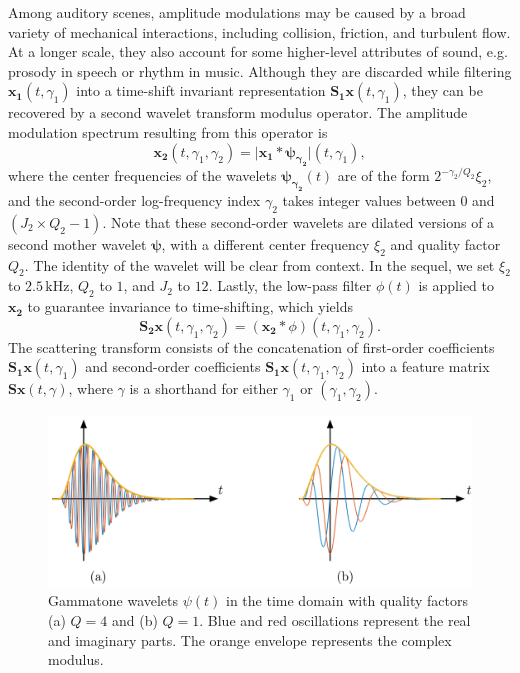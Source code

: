 \documentclass[journal]{IEEEtran}
\makeatletter
\newcommand*{\eg}{e.g.\@\xspace}
\makeatother
\begin{document}
Among auditory scenes, amplitude modulations may be caused by a broad variety of mechanical interactions, including collision, friction, and turbulent flow.
At a longer scale, they also account for some higher-level attributes of sound, \eg prosody in speech or rhythm in music.
Although they are discarded while filtering $\boldsymbol{x_1}(t,\gamma_1)$ into a time-shift invariant representation $\mathbf{S_1}\boldsymbol{x}(t,\gamma_1)$, they can be recovered by a second wavelet transform modulus operator.
The amplitude modulation spectrum resulting from this operator is
\begin{equation}
\boldsymbol{x_2}(t,\gamma_1,\gamma_2) =
\vert \boldsymbol{x_1} \ast \boldsymbol{\psi_{\gamma_2}} \vert(t,\gamma_1),
\end{equation}
where the center frequencies of the wavelets $\boldsymbol{\psi_{\gamma_2}}(t)$ are of the form $2^{-\gamma_2/Q_2} \xi_2$, and the second-order log-frequency index $\gamma_2$ takes integer values between $0$ and $(J_2 \times Q_2 - 1)$. Note that these second-order wavelets are dilated versions of a second mother wavelet $\boldsymbol{\psi}$, with a different center frequency $\xi_2$ and quality factor $Q_2$. The identity of the wavelet will be clear from context.
In the sequel, we set $\xi_2$ to $2.5\,\mathrm{kHz}$, $Q_2$ to $1$, and $J_2$ to $12$. Lastly, the low-pass filter $\phi(t)$ is applied to $\boldsymbol{x_2}$ to guarantee invariance to time-shifting, which yields
\begin{equation}
\mathbf{S_2}\boldsymbol{x}(t,\gamma_1,\gamma_2) =
(\boldsymbol{x_2} \ast \phi)(t,\gamma_1,\gamma_2).
\end{equation}
The scattering transform consists of the concatenation of first-order coefficients $\mathbf{S_1}\boldsymbol{x}(t,\gamma_1)$ and second-order coefficients $\mathbf{S_1}\boldsymbol{x}(t,\gamma_1,\gamma_2)$ into a feature matrix $\mathbf{S}\boldsymbol{x}(t,\gamma)$, where $\gamma$ is a shorthand for either $\gamma_1$ or $(\gamma_1,\gamma_2)$.

\begin{figure}
\begin{center}
\includegraphics[width=\columnwidth]{gammatones.png}
\caption{
\label{fig:gammatones}
Gammatone wavelets $\psi(t)$ in the time domain with quality factors (a) $Q = 4$ and (b) $Q = 1$. Blue and red oscillations represent the real and imaginary parts. The orange envelope represents the complex modulus.}
\end{center}
\end{figure}
\end{document}
